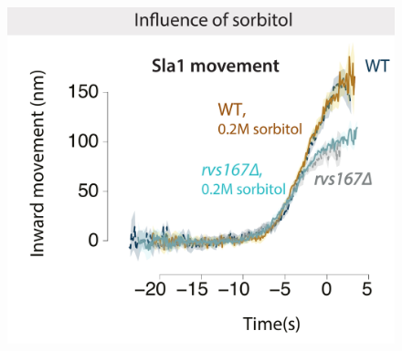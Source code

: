 	\begin{figure}
	\centering
	\includegraphics[width=14cm,height=14 cm,keepaspectratio]{figures/results_final/sorbitol}
	\end{figure}